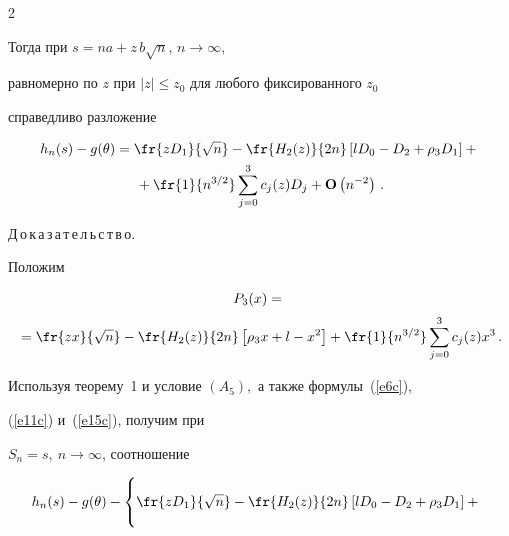 \begin{multicols}{2}
{{\begin{itemize}
   \end{itemize}}


   Тогда при $s=na+z\, b\sqrt{n}$, $n\rightarrow\infty$,


  равномерно по $z$ при $|z|\le z_0$ для любого фиксированного $z_0$


  справедливо разложение


  \begin{multline*} 


h_n(s)-g(\theta)=\fr{zD_1}{\sqrt{n}}-


     \fr{H_2(z)}{2n}\left[lD_0-D_2+\rho_3D_1\right]+{}\\


     {}+


     \fr{1}{n^{3/2}} \sum_{j=0}^3 c_j(z)D_j+


     {\bf O}\left(n^{-2}\right)\,.


  \end{multline*}


  }


\pagebreak







  


\noindent


Д\,о\,к\,а\,з\,а\,т\,е\,л\,ь\,с\,т\,в\,о. 


Положим   


\begin{multline*}   


P_3(x)={}\\[2pt]


{}= \fr{zx}{\sqrt{n}}- \fr{H_2(z)}{2n} \left[\rho_3 x+l-x^2 \right]+


       \fr{1}{n^{3/2}}\sum_{j=0}^3 c_j(z)x^3\,.


\end{multline*}


 Используя теорему~1 и условие $(A_5),$ а также формулы~(\ref{e6c}),


  (\ref{e11c}) и~(\ref{e15c}), получим при


  $S_n=s,~n\rightarrow\infty$, соотношение


  \begin{multline*}   


\!\!h_n(s)-g(\theta)-\left\{\vphantom{\sum_{j=0}^3}


 \fr{zD_1}{\sqrt{n}}-


     \fr{H_2(z)}{2n}\left[lD_0-D_2+\rho_3D_1\right]+{}\right.\\



\end{multline*}
\end{multicols}

